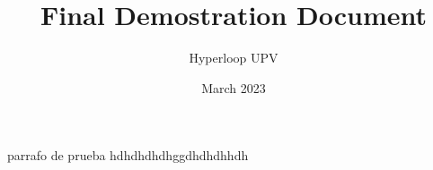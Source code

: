 \documentclass[12pt,openany]{book}
\title{Final Demostration Document}
\author{Hyperloop UPV}
\date{March 2023}
\begin{document}
    
    

    parrafo de prueba hdhdhdhdhggdhdhdhhdh
\end{document}
